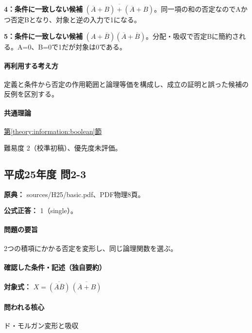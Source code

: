 \noindent\textbf{4：条件に一致しない候補} \(\overline{(\overline A+B)+(\overline A+B)}\)。同一項の和の否定なのでAかつ否定Bとなり、対象と逆の入力で1になる。\par

\noindent\textbf{5：条件に一致しない候補} \((A+\overline B)(\overline A+\overline B)\)。分配・吸収で否定Bに簡約される。A=\allowbreak{}0、B=\allowbreak{}0で1だが対象は0である。\par

\paragraph{再利用する考え方} 定義と条件から否定の作用範囲と論理等価を構成し、成立の証明と誤った候補の反例を区別する。

\paragraph{共通理論} \hyperref[theory:information:boolean]{第\ref*{theory:information:boolean}節}

\par 難易度 2（校準初稿）、優先度未評価。

\subsection{平成25年度 問2-3}
\label{q:h25-reg-basic-2-3}

\noindent\textbf{原典：} sources/H25/basic.pdf、PDF物理8頁。

\textbf{公式正答：} 1（single）。

\paragraph{問題の要旨} 2つの積項にかかる否定を変形し、同じ論理関数を選ぶ。

\paragraph{確認した条件・記述（独自要約）}\mbox{}\par

\noindent\textbf{対象式：} \(X=\overline{(\overline A\overline B)}\,\overline{(\overline A+B)}\)\par

\paragraph{問われる核心} ド・モルガン変形と吸収

